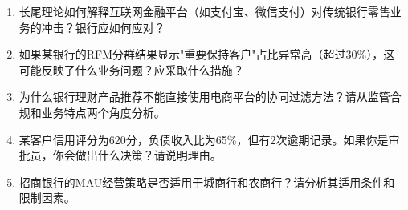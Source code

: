 \begin{exercisebox}[思考题]
\begin{enumerate}
  \item 长尾理论如何解释互联网金融平台（如支付宝、微信支付）对传统银行零售业务的冲击？银行应如何应对？
  \item 如果某银行的RFM分群结果显示"重要保持客户"占比异常高（超过30\%），这可能反映了什么业务问题？应采取什么措施？
  \item 为什么银行理财产品推荐不能直接使用电商平台的协同过滤方法？请从监管合规和业务特点两个角度分析。
  \item 某客户信用评分为620分，负债收入比为65\%，但有2次逾期记录。如果你是审批员，你会做出什么决策？请说明理由。
  \item 招商银行的MAU经营策略是否适用于城商行和农商行？请分析其适用条件和限制因素。
\end{enumerate}
\end{exercisebox}
